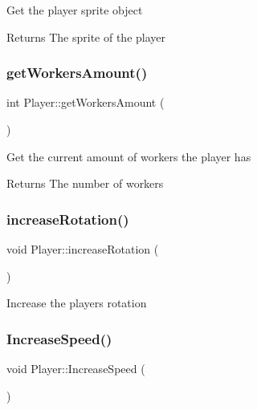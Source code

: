 Get the player sprite object 

\begin{DoxyReturn}{Returns}
The sprite of the player
\end{DoxyReturn}
\mbox{\label{class_player_a8ac0829fa3a82b6aa8ce61d40891afed}} 
\subsubsection{\texorpdfstring{getWorkersAmount()}{getWorkersAmount()}}
{\footnotesize\ttfamily int Player\+::get\+Workers\+Amount (\begin{DoxyParamCaption}{ }\end{DoxyParamCaption})}



Get the current amount of workers the player has 

\begin{DoxyReturn}{Returns}
The number of workers
\end{DoxyReturn}
\mbox{\label{class_player_a0f6f4bb800443551229331a68c3c3234}} 
\subsubsection{\texorpdfstring{increaseRotation()}{increaseRotation()}}
{\footnotesize\ttfamily void Player\+::increase\+Rotation (\begin{DoxyParamCaption}{ }\end{DoxyParamCaption})}



Increase the players rotation 

\mbox{\label{class_player_a58c5d05acd71193708fb9e3f29c4f08c}} 
\subsubsection{\texorpdfstring{IncreaseSpeed()}{IncreaseSpeed()}}
{\footnotesize\ttfamily void Player\+::\+Increase\+Speed (\begin{DoxyParamCaption}{ }\end{DoxyParamCaption})}



